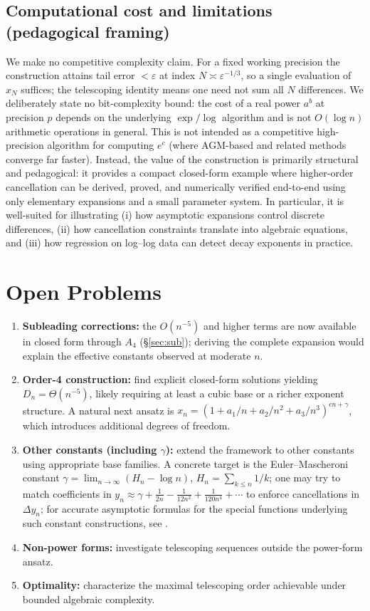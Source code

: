 \documentclass[11pt]{article}
\theoremstyle{definition}
\begin{document}
\subsection{Computational cost and limitations (pedagogical framing)}
We make no competitive complexity claim. For a fixed working precision the
construction attains tail error $<\varepsilon$ at index $N\asymp\varepsilon^{-1/3}$,
so a single evaluation of $x_N$ suffices; the telescoping identity means one
need not sum all $N$ differences. We deliberately state no bit-complexity bound:
the cost of a real power $a^{b}$ at precision $p$ depends on the underlying
$\exp/\log$ algorithm and is not $O(\log n)$ arithmetic operations in general. This is not
intended as a competitive high-precision algorithm for computing $e^{c}$ (where
AGM-based and related methods converge far faster). Instead, the value of the
construction is primarily structural and pedagogical: it provides a compact
closed-form example where higher-order cancellation can be derived, proved, and
numerically verified end-to-end using only elementary expansions and a small
parameter system. In particular, it is well-suited for illustrating (i) how
asymptotic expansions control discrete differences, (ii) how cancellation
constraints translate into algebraic equations, and (iii) how regression on
log--log data can detect decay exponents in practice.

\section{Open Problems}
\begin{enumerate}
  \item \textbf{Subleading corrections:} the $O(n^{-5})$ and higher terms are now
        available in closed form through $A_4$ (\S\ref{sec:sub}); deriving the
        complete expansion would explain the effective constants observed at
        moderate $n$.
  \item \textbf{Order-4 construction:} find explicit closed-form solutions
        yielding $D_n=\Theta(n^{-5})$, likely requiring at least a cubic base or a
        richer exponent structure. A natural next ansatz is
        $x_n=(1+a_1/n+a_2/n^2+a_3/n^3)^{cn+\gamma}$, which introduces additional
        degrees of freedom.
  \item \textbf{Other constants (including $\gamma$):} extend the framework to
        other constants using appropriate base families. A concrete target is the
        Euler--Mascheroni constant $\gamma = \lim_{n\to\infty}(H_n-\log n)$,
        $H_n=\sum_{k\le n}1/k$; one may try to match coefficients in
        $y_n\approx\gamma + \tfrac{1}{2n} - \tfrac{1}{12n^2} + \tfrac{1}{120n^4}+\cdots$
        to enforce cancellations in $\Delta y_n$; for accurate asymptotic formulas
        for the special functions underlying such constant constructions, see
        \cite{yangtian,yangtianarxiv}.
  \item \textbf{Non-power forms:} investigate telescoping sequences outside the
        power-form ansatz.
  \item \textbf{Optimality:} characterize the maximal telescoping order achievable
        under bounded algebraic complexity.
\end{enumerate}
\end{document}
